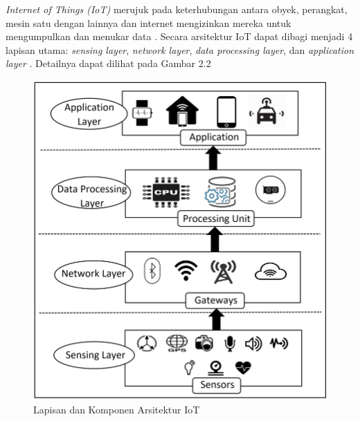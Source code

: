 \noindent \textit{Internet of Things (IoT)} merujuk pada keterhubungan antara obyek, perangkat, mesin satu dengan lainnya dan internet mengizinkan mereka untuk mengumpulkan dan menukar data \parencite{inproc:gazis}. Secara arsitektur IoT dapat dibagi menjadi 4 lapisan utama: \textit{sensing layer}, \textit{network layer}, \textit{data processing layer}, dan \textit{application layer} \parencite{article:sikder}. Detailnya dapat dilihat pada Gambar 2.2

\begin{figure}[ht]
    \includegraphics[width=0.6\linewidth, center]{images/tinjauan-pustaka/fig-iot-architecture.png}
    \caption{Lapisan dan Komponen Arsitektur IoT \parencite{article:sikder}}
    \label{fig:iot-architecture}
\end{figure}

